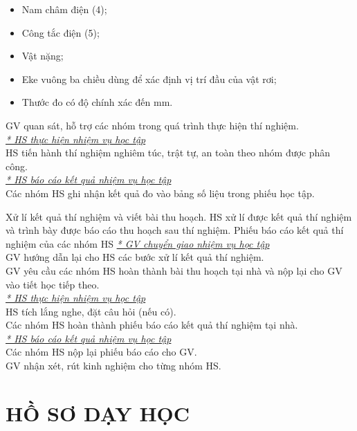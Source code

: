 {\begin{itemize}[label=-]
\begin{itemize}[label=$\bullet$]
			\item Nam châm điện (4);
			\item Công tắc điện (5);
			\item Vật nặng;
			\item Eke vuông ba chiều dùng để xác định vị trí đầu của vật rơi;
			\item Thước đo có độ chính xác đến $\si{\milli\meter}$.
		\end{itemize}
	\end{itemize}
	GV quan sát, hỗ trợ các nhóm trong quá trình thực hiện thí nghiệm.\\
	\textit{\underline{* HS thực hiện nhiệm vụ học tập}}\\
	HS tiến hành thí nghiệm nghiêm túc, trật tự, an toàn theo nhóm được phân công.\\
	\textit{\underline{* HS báo cáo kết quả nhiệm vụ học tập}}\\
	Các nhóm HS ghi nhận kết quả đo vào bảng số liệu trong phiếu học tập.
	
}
\hoatdong
{Xử lí kết quả thí nghiệm và viết bài thu hoạch.
}
{HS xử lí được kết quả thí nghiệm và trình bày được báo cáo thu hoạch sau thí nghiệm.	
}
{Phiếu báo cáo kết quả thí nghiệm của các nhóm HS	
}
{\textit{\underline{* GV chuyển giao nhiệm vụ học tập}}\\
	GV hướng dẫn lại cho HS các bước xử lí kết quả thí nghiệm.\\
	GV yêu cầu các nhóm HS hoàn thành bài thu hoạch tại nhà và nộp lại cho GV vào tiết học tiếp theo.\\
	\textit{\underline{* HS thực hiện nhiệm vụ học tập}}\\
	HS tích lắng nghe, đặt câu hỏi (nếu có).\\
	Các nhóm HS hoàn thành phiếu báo cáo kết quả thí nghiệm tại nhà.\\
	\textit{\underline{* HS báo cáo kết quả nhiệm vụ học tập}}\\
	Các nhóm HS nộp lại phiếu báo cáo cho GV.\\
	GV nhận xét, rút kinh nghiệm cho từng nhóm HS.
}
\section{HỒ SƠ DẠY HỌC}
